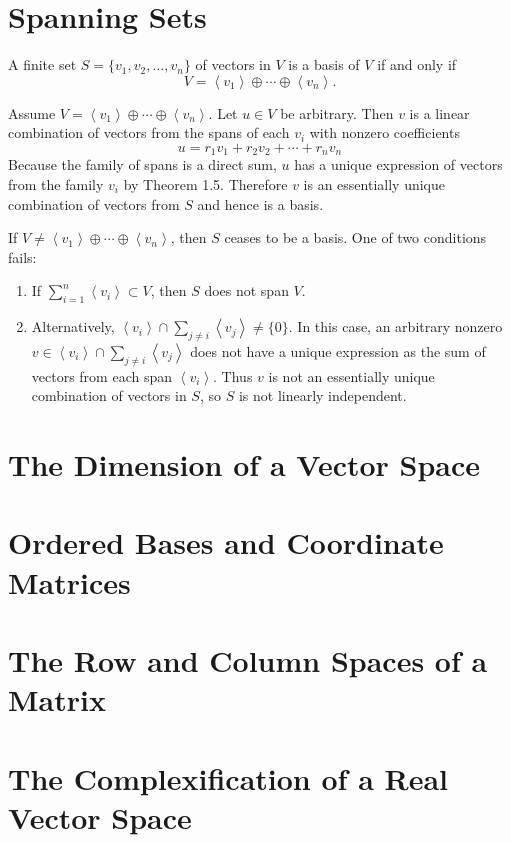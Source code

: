 \section{Spanning Sets}
\begin{theorem}
A finite set $S=\{v_1,v_2,\ldots,v_n\}$ of vectors in $V$ is a basis of $V$ if and only if 
\[
	V = \left\langle v_1\right\rangle \oplus \cdots \oplus \left\langle v_n\right\rangle.
\]

Assume $V = \left\langle v_1\right\rangle \oplus \cdots \oplus \left\langle v_n\right\rangle$. Let $u\in V$ be arbitrary. Then $v$ is a linear combination of vectors from the spans of each $v_i$ with nonzero coefficients
\[
	u = r_1v_1 + r_2v_2 + \cdots + r_nv_n
\]
Because the family of spans is a direct sum, $u$ has a unique expression of vectors from the family $v_i$ by Theorem 1.5. Therefore $v$ is an essentially unique combination of vectors from $S$ and hence is a basis.

If $V \neq \left\langle v_1\right\rangle \oplus \cdots \oplus \left\langle v_n\right\rangle$, then $S$ ceases to be a basis. One of two conditions fails:
\begin{enumerate}[label=\textit{Case \arabic*:}]
\item If $\displaystyle\sum_{i=1}^n \left\langle v_i\right\rangle\subset V$, then $S$ does not span $V$.

\item Alternatively, $\displaystyle\left\langle v_i\right\rangle \cap \sum_{j\neq i} \left\langle v_j\right\rangle \neq \{0\}$. In this case, an arbitrary nonzero $\displaystyle v\in \left\langle v_i\right\rangle\cap \sum_{j\neq i} \left\langle v_j\right\rangle$ does not have a unique expression as the sum of vectors from each span $\left\langle v_i\right\rangle$. Thus $v$ is not an essentially unique combination of vectors in $S$, so $S$ is not linearly independent.
\end{enumerate}
\end{theorem}

\section{The Dimension of a Vector Space}
\section{Ordered Bases and Coordinate Matrices}
\section{The Row and Column Spaces of a Matrix}
\section{The Complexification of a Real Vector Space}
